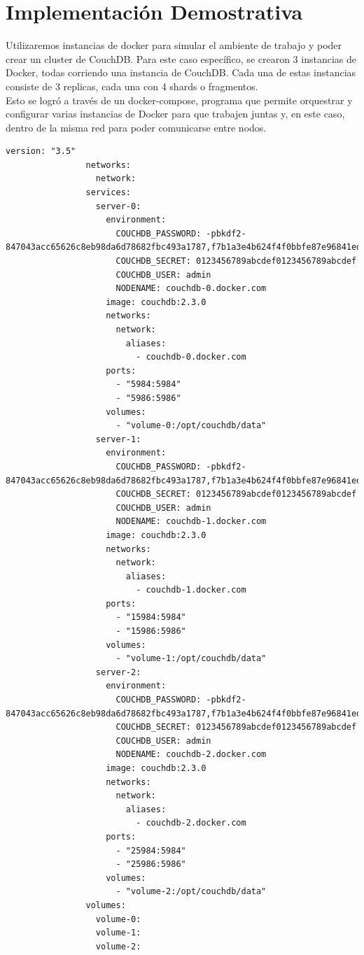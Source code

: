 \documentclass{article}
\begin{document}
    \section{Implementación Demostrativa}
		Utilizaremos instancias de docker para simular el ambiente de trabajo y poder crear un cluster de CouchDB. Para este caso específico, se crearon 3 instancias de Docker, todas corriendo una instancia de CouchDB. Cada una de estas instancias consiste de 3 replicas, cada una con 4 shards o fragmentos. \\
		Esto se logró a través de un docker-compose, programa que permite orquestrar y configurar varias instancias de Docker para que trabajen juntas y, en este caso, dentro de la misma red para poder comunicarse entre nodos.
		\begin{lstlisting}[gobble = 28]
				version: "3.5"
				networks:
				  network:
				services:
				  server-0:
					environment:
					  COUCHDB_PASSWORD: -pbkdf2-847043acc65626c8eb98da6d78682fbc493a1787,f7b1a3e4b624f4f0bbfe87e96841eda0,10
					  COUCHDB_SECRET: 0123456789abcdef0123456789abcdef
					  COUCHDB_USER: admin
					  NODENAME: couchdb-0.docker.com
					image: couchdb:2.3.0
					networks:
					  network:
						aliases:
						  - couchdb-0.docker.com
					ports:
					  - "5984:5984"
					  - "5986:5986"
					volumes:
					  - "volume-0:/opt/couchdb/data"
				  server-1:
					environment:
					  COUCHDB_PASSWORD: -pbkdf2-847043acc65626c8eb98da6d78682fbc493a1787,f7b1a3e4b624f4f0bbfe87e96841eda0,10
					  COUCHDB_SECRET: 0123456789abcdef0123456789abcdef
					  COUCHDB_USER: admin
					  NODENAME: couchdb-1.docker.com
					image: couchdb:2.3.0
					networks:
					  network:
						aliases:
						  - couchdb-1.docker.com
					ports:
					  - "15984:5984"
					  - "15986:5986"
					volumes:
					  - "volume-1:/opt/couchdb/data"
				  server-2:
					environment:
					  COUCHDB_PASSWORD: -pbkdf2-847043acc65626c8eb98da6d78682fbc493a1787,f7b1a3e4b624f4f0bbfe87e96841eda0,10
					  COUCHDB_SECRET: 0123456789abcdef0123456789abcdef
					  COUCHDB_USER: admin
					  NODENAME: couchdb-2.docker.com
					image: couchdb:2.3.0
					networks:
					  network:
						aliases:
						  - couchdb-2.docker.com
					ports:
					  - "25984:5984"
					  - "25986:5986"
					volumes:
					  - "volume-2:/opt/couchdb/data"
				volumes:
				  volume-0:
				  volume-1:
				  volume-2:
		\end{lstlisting}
 
\end{document}
